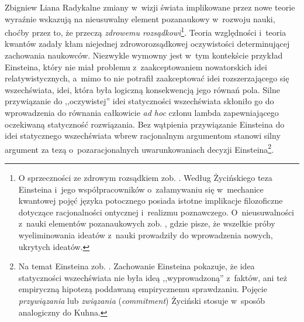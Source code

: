 \begin{artplenv}{Zbigniew Liana}
Radykalne zmiany w~wizji świata implikowane przez nowe teorie wyraźnie wskazują na nieusuwalny element pozanaukowy w~rozwoju
nauki, choćby przez to, że przeczą \textit{zdrowemu rozsądkowi}\footnote{O sprzeczności ze zdrowym rozsądkiem
zob.
\parencites[s.~249]{zycinski_jezyk_1983}[s.~176n]{zycinski_teizm_1985}.
Według Życińskiego teza Einsteina i~jego
współpracowników o~załamywaniu się w~mechanice kwantowej pojęć języka potocznego posiada istotne implikacje
filozoficzne dotyczące racjonalności ontycznej i~realizmu poznawczego. O~nieusuwalności z~nauki elementów pozanaukowych
zob.
\parencites[s.~34]{zycinski_structure_1988}[s.~60]{zycinski_struktura_2013},
gdzie pisze, że wszelkie próby wyeliminowania
ideatów z~nauki prowadziły do wprowadzenia nowych, ukrytych ideatów.}. Teoria względności i~teoria kwantów zadały kłam
niejednej zdroworozsądkowej oczywistości determinującej zachowania naukowców. Niezwykle wymowny jest w~tym kontekście 
przykład Einsteina, który nie miał problemu z~zaakceptowaniem nowatorskich idei relatywistycznych, a~mimo to nie
potrafił zaakceptować idei rozszerzającego się wszechświata, idei, która była logiczną konsekwencją jego równań pola.
Silne przywiązanie do ,,oczywistej'' idei statyczności wszechświata skłoniło go do wprowadzenia do równania całkowicie
\textit{ad hoc} członu lambda zapewniającego oczekiwaną statyczność rozwiązania. Bez wątpienia przywiązanie Einsteina do
idei statycznego wszechświata wbrew racjonalnym argumentom stanowi silny argument za tezą o~pozaracjonalnych
uwarunkowaniach decyzji \mbox{Einsteina}\footnote{Na temat Einsteina zob.
\parencites[s.~249]{zycinski_jezyk_1983}[s.~73]{zycinski_structure_1988}%
[s.~130]{zycinski_struktura_2013}[s.~189]{zycinski_elementy_1996}.
Zachowanie Einsteina pokazuje, że idea statyczności wszechświata nie była
ideą ,,wyprowadzoną'' z~faktów, ani też empiryczną hipotezą poddawaną empirycznemu sprawdzaniu. Pojęcie
\textit{przywiązania} lub \textit{związania} (\textit{commitment}) Życiński stosuje w~sposób analogiczny do Kuhna.}.


\end{artplenv}
